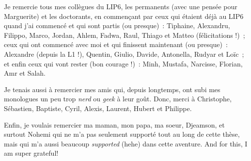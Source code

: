 Je remercie tous mes collègues du LIP6, les permanents (avec une pensée pour Marguerite) et les doctorants, en commençant par ceux qui étaient déjà au LIP6 quand j’ai commencé et qui sont partis (ou presque)~: Tiphaine, Alexandru, Filippo, Marco, Jordan, Ahlem, Fadwa, Raul, Thiago et Matteo (félicitations !)~; ceux qui ont commencé avec moi et qui finissent maintenant (ou presque)~: Alexandre (depuis la L1 !), Quentin, Giulio, Davide, Antonella, Rudyar et Loïc~; et enfin ceux qui vont rester (bon courage !)~: Minh, Mustafa, Narcisse, Florian, Amr et Salah.

Je tenais aussi à remercier mes amis qui, depuis longtemps, ont subi mes monologues un peu trop \textit{nerd} ou \textit{geek} à leur goût. Donc, merci à Christophe, Sébastien, Baptiste, Cyril, Alexis, Laurent, Hubert et Philippe.

Enfin, je voulais remercier ma maman, mon papa, ma soeur, Djeamson, et surtout Nohemi qui ne m’a pas seulement supporté tout au long de cette thèse, mais qui m’a aussi beaucoup \textit{supported} (hehe) dans cette aventure. And for this, I am super grateful!


